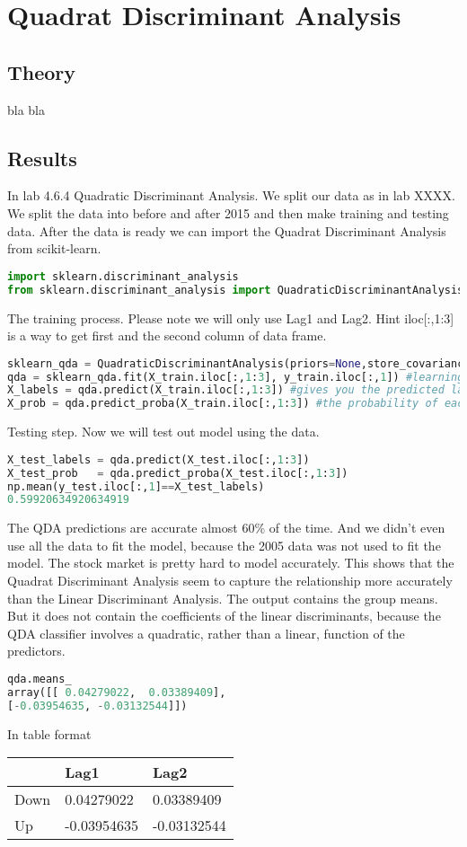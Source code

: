 \section{Quadrat Discriminant Analysis}
\subsection{Theory}
bla bla

\subsection{Results}
In lab 4.6.4 Quadratic Discriminant Analysis. We split our data as in lab XXXX. We split the data into before and after 2015 and then make training and testing data. After the data is ready we can import the Quadrat Discriminant Analysis from scikit-learn.
\begin{lstlisting}[language=Python]
import sklearn.discriminant_analysis
from sklearn.discriminant_analysis import QuadraticDiscriminantAnalysis
\end{lstlisting}
The training process. Please note we will only use Lag1 and Lag2. Hint iloc[:,1:3] is a way to get first and the second column of data frame.
\begin{lstlisting}[language=Python]
sklearn_qda = QuadraticDiscriminantAnalysis(priors=None,store_covariance=True) #creating a QDA object
qda = sklearn_qda.fit(X_train.iloc[:,1:3], y_train.iloc[:,1]) #learning the projection matrix
X_labels = qda.predict(X_train.iloc[:,1:3]) #gives you the predicted label for each sample
X_prob = qda.predict_proba(X_train.iloc[:,1:3]) #the probability of each sample to belong to each class
\end{lstlisting}
Testing step. Now we will test out model using the data.
\begin{lstlisting}[language=Python]
X_test_labels = qda.predict(X_test.iloc[:,1:3])
X_test_prob   = qda.predict_proba(X_test.iloc[:,1:3])
np.mean(y_test.iloc[:,1]==X_test_labels)
0.59920634920634919
\end{lstlisting}
The QDA predictions are accurate almost 60\% of the time. And we didn't even use all the data to fit the model, because the 2005 data was not used to fit the model. The stock market is pretty hard to model accurately.
This shows that the Quadrat Discriminant Analysis seem to capture the relationship more accurately than the Linear Discriminant Analysis. The output contains the group means. But it does not contain the coefficients of the linear discriminants, because the QDA classifier involves a quadratic, rather than a linear, function of the predictors.

\begin{lstlisting}[language=Python]
qda.means_
array([[ 0.04279022,  0.03389409],
[-0.03954635, -0.03132544]])
\end{lstlisting}
In table format
\begin{longtable}[]{@{}lll@{}}
	\toprule
	& Lag1 & Lag2\tabularnewline
	\midrule
	\endhead
	Down & 0.04279022 & 0.03389409\tabularnewline
	Up & -0.03954635 & -0.03132544\tabularnewline
	\bottomrule
\end{longtable}